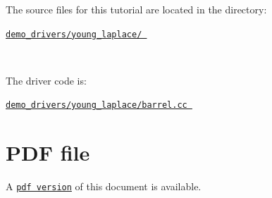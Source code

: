 \begin{DoxyItemize}
\item The source files for this tutorial are located in the directory\+:~\newline
~\newline
 \begin{center} \href{../../../../demo_drivers/young_laplace/}{\tt demo\+\_\+drivers/young\+\_\+laplace/ } \end{center} ~\newline

\item The driver code is\+: ~\newline
~\newline
 \begin{center} \href{../../../../demo_drivers/young_laplace/barrel.cc}{\tt demo\+\_\+drivers/young\+\_\+laplace/barrel.\+cc } \end{center} 
\end{DoxyItemize}



 

 \hypertarget{index_pdf}{}\section{P\+D\+F file}\label{index_pdf}
A \href{../latex/refman.pdf}{\tt pdf version} of this document is available. 

